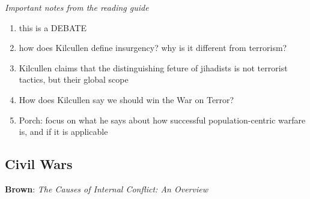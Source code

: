 \documentclass{article}
\begin{document}
\textit{Important notes from the reading guide}
\begin{enumerate}
    \item this is a DEBATE
    \item how does Kilcullen define insurgency? why is it different from terrorism?
    \item Kilcullen claims that the distinguishing feture of jihadists is not terrorist tactics, but their global scope
    \item How does Kilcullen say we should win the War on Terror?
    \item Porch: focus on what he says about how successful population-centric warfare is, and if it is applicable
\end{enumerate}
\subsection*{Civil Wars}
\textbf{Brown}: \textit{The Causes of Internal Conflict: An Overview}
\end{document}
